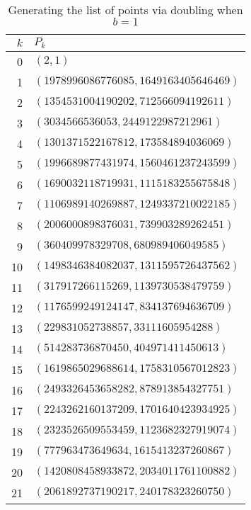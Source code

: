\begin{table}[htbp]
	\centering
	\begin{tabular}{r|l}
		$k$ & $P_k$\\
		\hline
		0 & $(2, 1)$\\
		1 & $(1978996086776085, 1649163405646469)$\\
		2 & $(1354531004190202, 712566094192611)$\\
		3 & $(3034566536053, 2449122987212961)$\\
		4 & $(1301371522167812, 173584894036069)$\\
		5 & $(1996689877431974, 1560461237243599)$\\
		6 & $(1690032118719931, 1115183255675848)$\\
		7 & $(1106989140269887, 1249337210022185)$\\
		8 & $(2006000898376031, 739903289262451)$\\
		9 & $(360409978329708, 680989406049585)$\\
		10 & $(1498346384082037, 1311595726437562)$\\
		11 & $(317917266115269, 1139730538479759)$\\
		12 & $(1176599249124147, 834137694636709)$\\
		13 & $(229831052738857, 33111605954288)$\\
		14 & $(514283736870450, 404971411450613)$\\
		15 & $(1619865029688614, 1758310567012823)$\\
		16 & $(2493326453658282, 878913854327751)$\\
		17 & $(2243262160137209, 1701640423934925)$\\
		18 & $(2323526509553459, 1123682327919074)$\\
		19 & $(777963473649634, 1615413237260867)$\\
		20 & $(1420808458933872, 2034011761100882)$\\
		21 & $(2061892737190217, 240178323260750)$
	\end{tabular}
	\caption{Generating the list of points via doubling when $b=1$}
	\label{unsuccessfuldouble}
\end{table}

